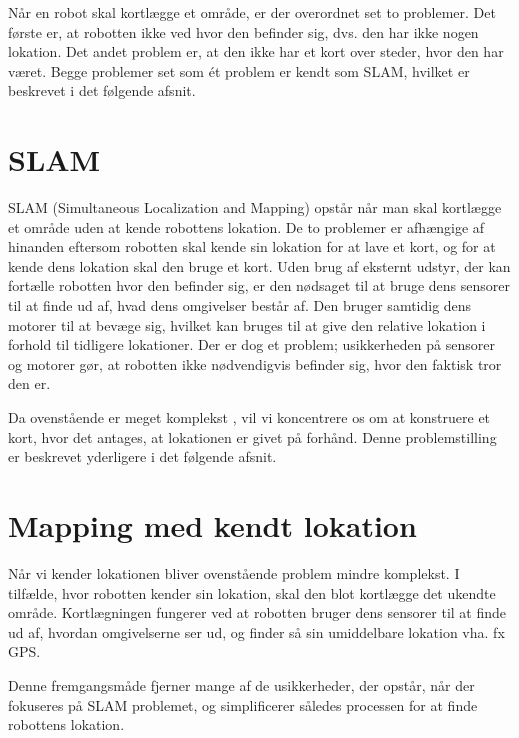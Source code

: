 Når en robot skal kortlægge et område, er der overordnet set to problemer. 
Det første er, at robotten ikke ved hvor den befinder sig, dvs. den har ikke nogen lokation.
Det andet problem er, at den ikke har et kort over steder, hvor den har været.
Begge problemer set som ét problem er kendt som SLAM, hvilket er beskrevet i det følgende afsnit.

\section*{SLAM}\label{SLAM}
SLAM (Simultaneous Localization and Mapping) opstår når man skal kortlægge et område uden at kende robottens lokation.
De to problemer er afhængige af hinanden eftersom robotten skal kende sin lokation for at lave et kort, og for at kende dens lokation skal den bruge et kort.
Uden brug af eksternt udstyr, der kan fortælle robotten hvor den befinder sig, er den nødsaget til at bruge dens sensorer til at finde ud af, hvad dens omgivelser består af.
Den bruger samtidig dens motorer til at bevæge sig, hvilket kan bruges til at give den relative lokation i forhold til tidligere lokationer.
Der er dog et problem; usikkerheden på sensorer og motorer gør, at robotten ikke nødvendigvis befinder sig, hvor den faktisk tror den er.

Da ovenstående er meget komplekst \cite[s.~514]{thrun2002particle}, vil vi koncentrere os om at konstruere et kort, hvor det antages, at lokationen er givet på forhånd. 
Denne problemstilling er beskrevet yderligere i det følgende afsnit.

\section*{Mapping med kendt lokation}\label{map_lok}
Når vi kender lokationen bliver ovenstående problem mindre komplekst.
I tilfælde, hvor robotten kender sin lokation, skal den blot kortlægge det ukendte område.
Kortlægningen fungerer ved at robotten bruger dens sensorer til at finde ud af, hvordan omgivelserne ser ud, og finder så sin umiddelbare lokation vha. fx GPS.

Denne fremgangsmåde fjerner mange af de usikkerheder, der opstår, når der fokuseres på SLAM problemet, og simplificerer således processen for at finde robottens lokation.